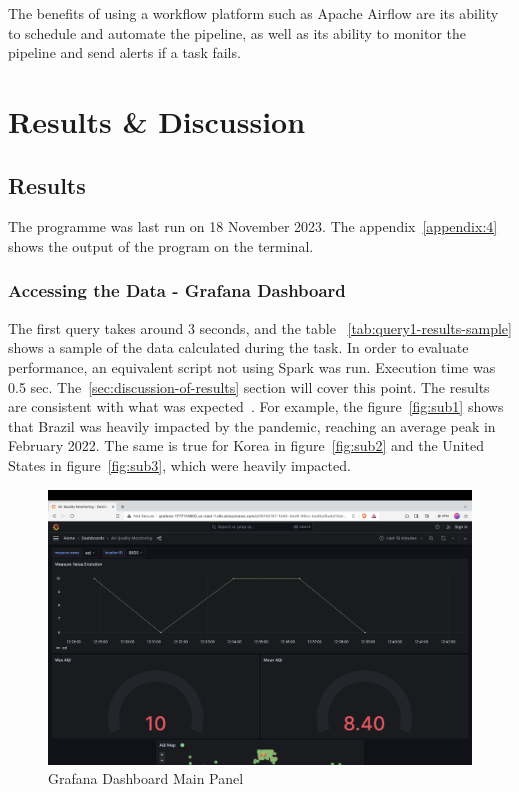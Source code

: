 \documentclass[12pt,oneside]{book} %
\begin{document}
The benefits of using a workflow platform such as Apache Airflow are its
ability to schedule and automate the pipeline, as well as its ability to
monitor the pipeline and send alerts if a task fails.

\newpage
\chapter{Results \& Discussion}

\section{Results}
The programme was last run on 18 November 2023. The appendix~\ref{appendix:4}
shows the output of the program on the terminal.

\subsection{Accessing the Data - Grafana Dashboard}

The first query takes around 3 seconds, and the table
~\ref{tab:query1-results-sample} shows a sample of the data calculated during
the task. In order to evaluate performance, an equivalent script not using
Spark was run. Execution time was 0.5 sec. The~\ref{sec:discussion-of-results}
section will cover this point. The results are consistent with what was
expected~\cite{NYT}. For example, the figure~\ref{fig:sub1} shows that Brazil
was heavily impacted by the pandemic, reaching an average peak in February
2022. The same is true for Korea in figure~\ref{fig:sub2} and the United States
in figure~\ref{fig:sub3}, which were heavily impacted.

\begin{figure}[H]
    \centering
    \includegraphics[width=1\linewidth]{images/grafana-1.png}
    \caption{Grafana Dashboard Main Panel}\label{fig:top-100-locations-most-affected}
\end{figure}
\end{document}
